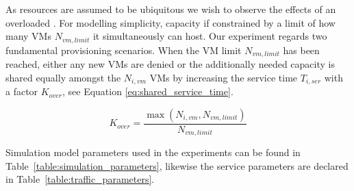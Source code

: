 %

As resources are assumed to be ubiquitous we wish to observe the effects of an overloaded \dc{}. For modelling simplicity, \dc{} capacity if constrained by a limit of how many VMs $N_{vm,limit}$ it simultaneously can host. Our experiment regards two fundamental provisioning scenarios. When the VM limit $N_{vm,limit}$ has been reached, either any new VMs are denied or the additionally needed \dc{} capacity is shared equally amongst the $N_{i,vm}$ VMs by increasing the service time $T_{i,ser}$ with a factor $K_{over}$, see Equation \ref{eq:shared_service_time}.

\begin{equation}
	\label{eq:shared_service_time}
	K_{over} = \frac{ \max(N_{i,vm},N_{vm,limit}) }{ N_{vm,limit} }
\end{equation}



Simulation model parameters used in the experiments can be found in Table~\ref{table:simulation_parameters}, likewise the service parameters are declared in Table~\ref{table:traffic_parameters}.



